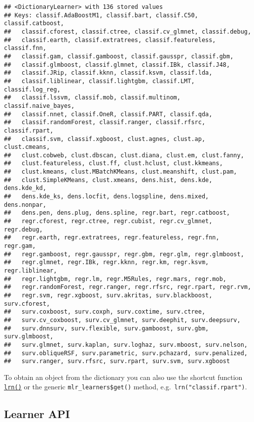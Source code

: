 \documentclass[
]{scrbook}
\begin{document}
\begin{verbatim}
## <DictionaryLearner> with 136 stored values
## Keys: classif.AdaBoostM1, classif.bart, classif.C50, classif.catboost,
##   classif.cforest, classif.ctree, classif.cv_glmnet, classif.debug,
##   classif.earth, classif.extratrees, classif.featureless, classif.fnn,
##   classif.gam, classif.gamboost, classif.gausspr, classif.gbm,
##   classif.glmboost, classif.glmnet, classif.IBk, classif.J48,
##   classif.JRip, classif.kknn, classif.ksvm, classif.lda,
##   classif.liblinear, classif.lightgbm, classif.LMT, classif.log_reg,
##   classif.lssvm, classif.mob, classif.multinom, classif.naive_bayes,
##   classif.nnet, classif.OneR, classif.PART, classif.qda,
##   classif.randomForest, classif.ranger, classif.rfsrc, classif.rpart,
##   classif.svm, classif.xgboost, clust.agnes, clust.ap, clust.cmeans,
##   clust.cobweb, clust.dbscan, clust.diana, clust.em, clust.fanny,
##   clust.featureless, clust.ff, clust.hclust, clust.kkmeans,
##   clust.kmeans, clust.MBatchKMeans, clust.meanshift, clust.pam,
##   clust.SimpleKMeans, clust.xmeans, dens.hist, dens.kde, dens.kde_kd,
##   dens.kde_ks, dens.locfit, dens.logspline, dens.mixed, dens.nonpar,
##   dens.pen, dens.plug, dens.spline, regr.bart, regr.catboost,
##   regr.cforest, regr.ctree, regr.cubist, regr.cv_glmnet, regr.debug,
##   regr.earth, regr.extratrees, regr.featureless, regr.fnn, regr.gam,
##   regr.gamboost, regr.gausspr, regr.gbm, regr.glm, regr.glmboost,
##   regr.glmnet, regr.IBk, regr.kknn, regr.km, regr.ksvm, regr.liblinear,
##   regr.lightgbm, regr.lm, regr.M5Rules, regr.mars, regr.mob,
##   regr.randomForest, regr.ranger, regr.rfsrc, regr.rpart, regr.rvm,
##   regr.svm, regr.xgboost, surv.akritas, surv.blackboost, surv.cforest,
##   surv.coxboost, surv.coxph, surv.coxtime, surv.ctree,
##   surv.cv_coxboost, surv.cv_glmnet, surv.deephit, surv.deepsurv,
##   surv.dnnsurv, surv.flexible, surv.gamboost, surv.gbm, surv.glmboost,
##   surv.glmnet, surv.kaplan, surv.loghaz, surv.mboost, surv.nelson,
##   surv.obliqueRSF, surv.parametric, surv.pchazard, surv.penalized,
##   surv.ranger, surv.rfsrc, surv.rpart, surv.svm, surv.xgboost
\end{verbatim}

To obtain an object from the dictionary you can also use the shortcut function \href{https://mlr3.mlr-org.com/reference/mlr_sugar.html}{\texttt{lrn()}} or the generic \texttt{mlr\_learners\$get()} method, e.g.~\texttt{lrn("classif.rpart")}.

\hypertarget{learner-api}{%
\subsection{Learner API}\label{learner-api}}
\end{document}
